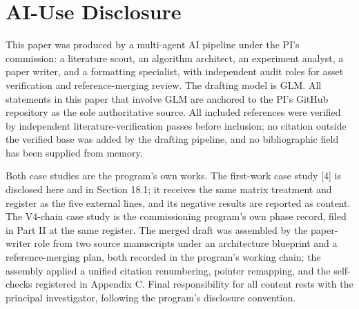 \documentclass[11pt]{article}
\begin{document}
\section{AI-Use Disclosure}
\label{sec:23}
\noindent This paper was produced by a multi-agent AI pipeline under the PI's commission: a literature scout, an algorithm architect, an experiment analyst, a paper writer, and a formatting specialist, with independent audit roles for asset verification and reference-merging review. The drafting model is GLM. All statements in this paper that involve GLM are anchored to the PI's GitHub repository as the sole authoritative source. All included references were verified by independent literature-verification passes before inclusion; no citation outside the verified base was added by the drafting pipeline, and no bibliographic field has been supplied from memory.\par
\noindent Both case studies are the program's own works. The first-work case study [4] is disclosed here and in Section 18.1; it receives the same matrix treatment and register as the five external lines, and its negative results are reported as content. The V4-chain case study is the commissioning program's own phase record, filed in Part II at the same register. The merged draft was assembled by the paper-writer role from two source manuscripts under an architecture blueprint and a reference-merging plan, both recorded in the program's working chain; the assembly applied a unified citation renumbering, pointer remapping, and the self-checks registered in Appendix C. Final responsibility for all content rests with the principal investigator, following the program's disclosure convention.\par
\end{document}
